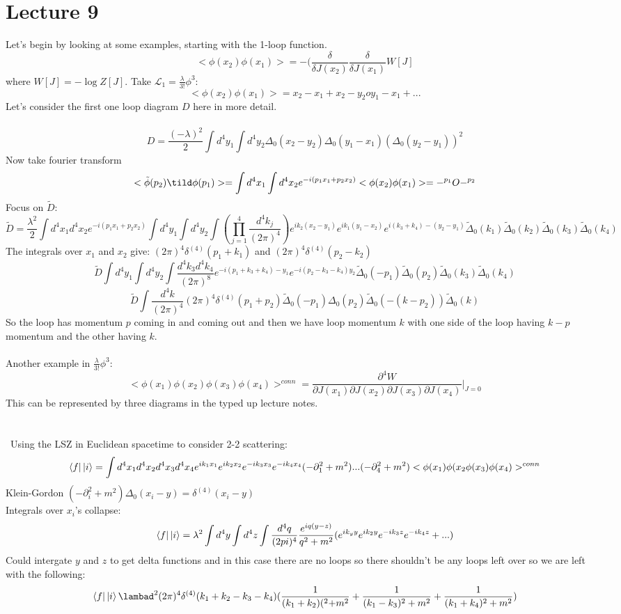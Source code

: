 \documentclass{article}
\begin{document}
\section{Lecture 9}
Let's begin by looking at some examples, starting with the 1-loop function.
$$
< \phi(x_2) \phi(x_1)> = - (\frac{\delta}{\delta J(x_2)} \frac{\delta}{\delta J(x_1)} W[J]
$$
where $W[J] = - \log Z[J]$. Take $\mathcal{L}_1 = \frac{\lambda}{3!} \phi^3$:
$$
< \phi(x_2) \phi(x_1) > = x_2 - x_1 + x_2-y_2oy_1-x_1 + ...
$$
Let's consider the first one loop diagram $D$ here in more detail.\\\\
$$
D = \frac{(- \lambda)^2}{2}\int d^{4}y_1 \int d^4 y_2 \Delta_0(x_2-y_2) \Delta_0(y_1- x_1) (\Delta_0( y_2-y_1))^2
$$
Now take fourier transform
$$
< \tilde \phi(p_2) \tild \phi (p_1) > = \int d^4 x_1 \int d^4 x_2 e^{-i(p_1 x_1 + p_2 x_2)}< \phi(x_2) \phi (x_1)> = -^{p_1} O -^{p_2}
$$
Focus on $\tilde D$:
$$
\tilde D = \frac{\lambda^2}{2} \int d^4 x_1 d^4 x_2 e^{-i(p_1 x_1 + p_2 x_2)} \int d^4 y_1 \int d^4 y_2 \int (\prod_{j=1}^4 \frac{d^4 k_j}{(2\pi)^4}) e^{ik_2(x_2-y_1)} e^{ik_1(y_1 - x_2)} e^{i(k_3 + k_4) - (y_2 - y_1)} \tilde \Delta_0(k_1) \tilde \Delta_0(k_2) \tilde \Delta_0(k_3) \tilde \Delta_0(k_4)
$$
The integrals over $x_1$ and $x_2$ give: $(2\pi)^4 \delta^{(4)} (p_1 + k_1)$ and $(2\pi)^4 \delta^{(4)} (p_2 - k_2)$
$$
\tilde D \int d^4 y_1 \int d^4 y_2 \int \frac{d^4 k_3 d^4 k_4}{(2\pi)^8} e^{-i(p_1 + k_3 + k_4) - y_1 } e^{-i( p_2 - k_3 - k_4) y_2} \tilde \Delta_0(-p_1) \tilde \Delta_0(p_2) \tilde \Delta_0(k_3) \tilde \Delta_0(k_4)
$$
$$
\tilde D \int \frac{d^4 k}{(2\pi)^4} (2 \pi)^4 \delta^{(4)}(p_1 + p_2) \tilde \Delta_0(-p_1) \Delta_0(p_2) \tilde \Delta_0 ( -(k-p_2)) \tilde \Delta_0 (k)
$$
So the loop has momentum $p$ coming in and coming out and then we have loop momentum $k$ with one side of the loop having $k-p$ momentum and the other having $k$. \\\\
Another example in $\frac{\lambda}{3!} \phi^3$:
$$
< \phi(x_1) \phi(x_2) \phi(x_3) \phi(x_4)>^{conn} = \frac{\partial^4 W}{\partial J(x_1) \partial J(x_2) \partial J(x_3) \partial J(x_4)}|_{J=0}
$$
This can be represented by three diagrams in the typed up lecture notes.\\\\\\\
Using the LSZ in Euclidean spacetime to consider 2-2 scattering:
$$
\bra{f}\ket{i} = \int d^4 x_1 d^4 x_2 d^4 x_3 d^4 x_4 e^{ik_1 x_1} e^{ik_2 x_2} e^{-ik_3 x_3} e^{-ik_4 x_4} (- \partial_1^2 + m^2)...(-\partial_4^2 + m^2) < \phi(x_1) \phi(x_2 \phi(x_3) \phi(x_4) >^{conn}
$$
Klein-Gordon $(- \partial_i^2 + m^2) \Delta_0 ( x_i -y) = \delta^{(4)}(x_i - y)$\\
Integrals over $x_i$'s collapse:
$$
\bra{f} \ket{i} = \lambda^2 \int d^4 y \int d^4 z \int \frac{d^4 q}{(2pi)^4} \frac{e^{iq (y-z)}}{q^2 + m^2} ( e^{ik_y y}e^{ik_2y} e^{-ik_3 z} e^{-ik_4z} +...)
$$
Could intergate $y$ and $z$ to get delta functions and in this case there are no loops so there shouldn't be any loops left over so we are left with the following:
$$
\bra{f} \ket{i} \lambad^2 (2 \pi)^4 \delta^{(4)} (k_1 + k_2 - k_3 - k_4) ( \frac{1}{(k_1 + k_2)(^2 + m^2} + \frac{1}{(k_1-k_3)^2 + m^2} + \frac{1}{(k_1 + k_4)^2 + m^2})
$$
\end{document}
